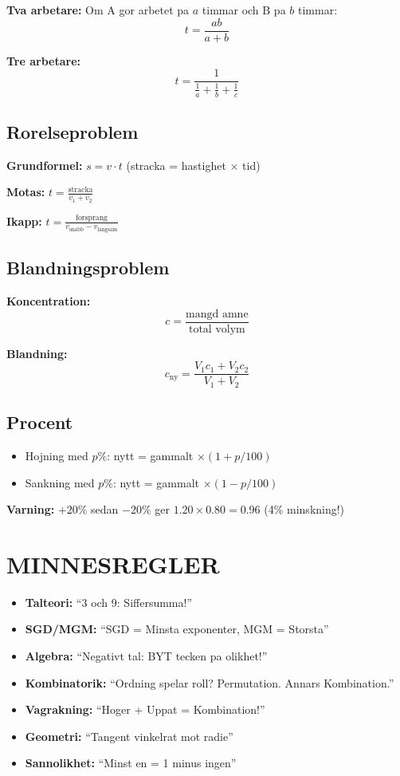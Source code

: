 \documentclass[11pt,a4paper]{article}
\newenvironment{formelbox}{\begin{framed}\color{mainblue}}{\end{framed}}
\begin{document}
\begin{formelbox}
\textbf{Tva arbetare:} Om A gor arbetet pa $a$ timmar och B pa $b$ timmar:
\[ t = \frac{ab}{a+b} \]
\end{formelbox}

\textbf{Tre arbetare:}
\[ t = \frac{1}{\frac{1}{a} + \frac{1}{b} + \frac{1}{c}} \]

\subsection{Rorelseproblem}

\textbf{Grundformel:} $s = v \cdot t$ (stracka = hastighet $\times$ tid)

\begin{formelbox}
\textbf{Motas:} $t = \frac{\text{stracka}}{v_1 + v_2}$

\textbf{Ikapp:} $t = \frac{\text{forsprang}}{v_{\text{snabb}} - v_{\text{langsam}}}$
\end{formelbox}

\subsection{Blandningsproblem}

\textbf{Koncentration:}
\[ c = \frac{\text{mangd amne}}{\text{total volym}} \]

\textbf{Blandning:}
\[ c_{\text{ny}} = \frac{V_1 c_1 + V_2 c_2}{V_1 + V_2} \]

\subsection{Procent}

\begin{itemize}
\item Hojning med $p\%$: nytt = gammalt $\times (1 + p/100)$
\item Sankning med $p\%$: nytt = gammalt $\times (1 - p/100)$
\end{itemize}

\textbf{Varning:} $+20\%$ sedan $-20\%$ ger $1.20 \times 0.80 = 0.96$ (4\% minskning!)

\section{MINNESREGLER}

\begin{itemize}
\item \textbf{Talteori:} ``3 och 9: Siffersumma!''
\item \textbf{SGD/MGM:} ``SGD = Minsta exponenter, MGM = Storsta''
\item \textbf{Algebra:} ``Negativt tal: BYT tecken pa olikhet!''
\item \textbf{Kombinatorik:} ``Ordning spelar roll? Permutation. Annars Kombination.''
\item \textbf{Vagrakning:} ``Hoger + Uppat = Kombination!''
\item \textbf{Geometri:} ``Tangent vinkelrat mot radie''
\item \textbf{Sannolikhet:} ``Minst en = 1 minus ingen''
\end{itemize}
\end{document}
